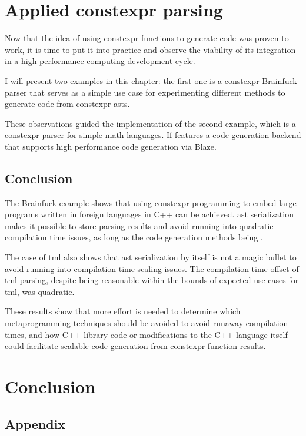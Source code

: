 \documentclass[english,12pt,a4paper]{book}
\providecommand{\cpp}{\textsc{C++}\xspace}
\begin{document}



\chapter{
  Applied constexpr parsing
}

Now that the idea of using \gls{constexpr} functions to generate code
was proven to work, it is time to put it into practice and observe
the viability of its integration in a high performance computing
development cycle.

I will present two examples in this chapter:
the first one is a \gls{constexpr} Brainfuck parser that serves as a simple
use case for experimenting different methods to generate code from
\gls{constexpr} \glspl{ast}.

These observations guided the implementation of the second example, which is a
\gls{constexpr} parser for simple math languages. If features a code generation
backend that supports high performance code generation via Blaze.




\section{Conclusion}

The Brainfuck example shows that using \gls{constexpr} programming to embed
large programs written in foreign languages in \cpp can be achieved.
\gls{ast} serialization makes it possible to store parsing results
and avoid running into quadratic compilation time issues, as long as
the code generation methods being .

The case of \gls{tml} also shows that \gls{ast} serialization
by itself is not a magic bullet to avoid running into compilation time
scaling issues.
The compilation time offset of \gls{tml} parsing, despite being reasonable
within the bounds of expected use cases for \gls{tml}, was quadratic.

These results show that more effort is needed to determine which metaprogramming
techniques should be avoided to avoid runaway compilation times,
and how \cpp library code or modifications to the \cpp language itself
could facilitate scalable code generation from \gls{constexpr} function results.

\chapter*{Conclusion}



\clearpage
\printglossaries

\clearpage
\printbibliography

\begin{appendices}
\chapter{Appendix}
\end{appendices}

\appendix


\end{document}
